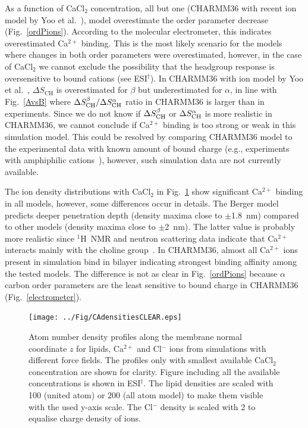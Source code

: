 \documentclass[twoside,twocolumn,9pt]{article}
\begin{document}
As a function of CaCl$_2$ concentration, all but one (CHARMM36 with recent ion model by Yoo et al.~\cite{yoo16}),
model overestimate the order parameter decrease (Fig.~\ref{ordPions}). 
According to the molecular electrometer, this indicates overestimated Ca$^{2+}$ binding. 
This is the most likely scenario for the models where changes in both order parameters were overestimated,
however, in the case of CaCl$_2$ we cannot exclude the possibility that the headgroup response is oversensitive to
bound cations (see ESI$^\dag$).
In CHARMM36 with ion model by Yoo et al.~\cite{yoo16},
$\Delta S_\mathrm{CH}$ is overestimated for $\beta$  but underestimated for  $\alpha$,
in line with Fig.~\ref{AvsB} where $\Delta S_{\rm{CH}}^{\beta}/\Delta S_{\rm{CH}}^{\alpha}$ ratio
in CHARMM36 is larger  than in experiments. Since we do not know if $\Delta S_{\rm{CH}}^{\beta}$ or $\Delta S_{\rm{CH}}^{\alpha}$
is more realistic in CHARMM36, we cannot conclude if Ca$^{2+}$ binding is too strong or weak in this simulation model.
This could be resolved by comparing CHARMM36 model to the experimental data with known amount of bound charge 
(e.g., experiments with amphiphilic cations~\cite{scherer89,franzin98}), however, such simulation data are not
currently available.

The ion density distributions with CaCl$_2$ in Fig.~\ref{CAdensitiesCLEAR} show significant
Ca$^{2+}$ binding in all models, however, some differences occur in details.
The Berger model predicts deeper penetration depth (density maxima close to $\pm$1.8~nm) compared
to other models (density maxima close to $\pm$2~nm). The latter value is probably more realistic 
since $^1$H~NMR and neutron scattering data indicate that Ca$^{2+}$ interacts mainly with the 
choline group~\cite{hauser76,hauser78,herbette84,cevc90}. In CHARMM36, almost all Ca$^{2+}$
ions present in simulation bind in bilayer indicating strongest binding affinity among the tested
models. The difference is not as clear in Fig.~\ref{ordPions} because $\alpha$ carbon order parameters 
are the least sensitive to bound charge in CHARMM36 (Fig.~\ref{electrometer}).
\begin{figure}[t]
  \centering
  \texttt{[image: ../Fig/CAdensitiesCLEAR.eps]}
  \caption{\label{CAdensitiesCLEAR}
    Atom number density profiles along the membrane normal coordinate $z$ for lipids, Ca$^{2+}$ and Cl$^-$ ions from simulations 
    with different force fields.
    The profiles only with smallest available CaCl$_2$ concentration are shown for clarity.
    Figure including all the available concentrations is shown in ESI$^\dag$.
    The lipid densities are scaled with 100 (united atom) or 200 (all atom model) to make them visible with the used y-axis scale.
    The Cl$^-$ density is scaled with 2 to equalise charge density of ions.
  }
\end{figure}
\end{document}
